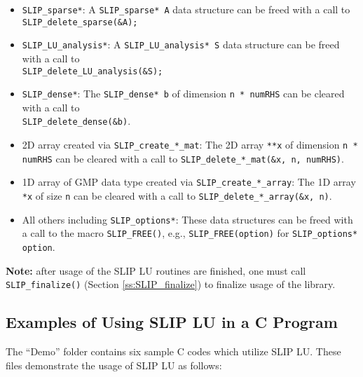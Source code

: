 \documentclass[12pt]{article}
\theoremstyle{definition}
\begin{document}
\begin{itemize}
\item \verb|SLIP_sparse*|: A \verb|SLIP_sparse* A| data structure can be freed with a call to \verb|SLIP_delete_sparse(&A);|
\item \verb|SLIP_LU_analysis*|: A \verb|SLIP_LU_analysis* S| data structure can be freed with a call to\\ \verb|SLIP_delete_LU_analysis(&S);|
\item \verb|SLIP_dense*|: The \verb|SLIP_dense* b| of dimension \verb|n * numRHS| can be cleared with a call to \\ \verb|SLIP_delete_dense(&b)|.
\item 2D array created via \verb|SLIP_create_*_mat|: The 2D array \verb|**x| of dimension \verb|n * numRHS| can be cleared with a call to  \verb|SLIP_delete_*_mat(&x, n, numRHS)|.
\item 1D array of GMP data type created via \verb|SLIP_create_*_array|: The 1D array \verb|*x| of size \verb|n| can be cleared with a call to  \verb|SLIP_delete_*_array(&x, n)|.
\item All others including \verb|SLIP_options*|: These data structures can be freed with a call to the macro \verb|SLIP_FREE()|, e.g., \verb|SLIP_FREE(option)| for \verb|SLIP_options* option|.
\end{itemize}

\textbf{Note:} after usage of the SLIP LU routines are finished, one must call \verb|SLIP_finalize()| (Section \ref{ss:SLIP_finalize}) to finalize usage of the library.


\cprotect\subsection{Examples of Using SLIP LU in a C Program} \label{s:Using:Examples}

The ``Demo'' folder contains six sample C codes which utilize SLIP LU. These files demonstrate the usage of SLIP LU as follows:
\end{document}
